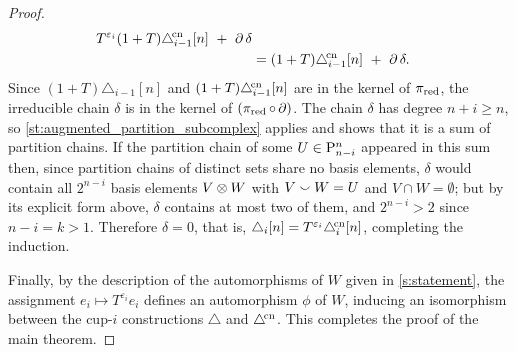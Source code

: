 \begin{proof}
\begin{equation}
\begin{split}
			T^{\varepsilon_i}(1+T)\canonical_{i-1}[n] \ +\ \bd\delta \\ &=
			(1+T)\canonical_{i-1}[n] \ +\ \bd\delta.
		\end{split}
	\end{equation}
	Since $(1+T)\triangle_{i-1}[n]$ and $(1+T)\canonical_{i-1}[n]$ are in the kernel of $\pired$, the irreducible chain $\delta$ is in the kernel of $(\pired \circ \bd)$.
	The chain $\delta$ has degree $n+i\geq n$, so \cref{st:augmented_partition_subcomplex} applies and shows that it is a sum of partition chains.
	If the partition chain of some $U \in \P^n_{n-i}$ appeared in this sum then, since partition chains of distinct sets share no basis elements, $\delta$ would contain all $2^{n-i}$ basis elements $V \ot W$ with $V \union W = U$ and $V \cap W = \emptyset$; but by its explicit form above, $\delta$ contains at most two of them, and $2^{n-i} > 2$ since $n - i = k > 1$.
	Therefore $\delta = 0$, that is, $\triangle_i[n] = T^{\varepsilon_i}\canonical_i[n]$, completing the induction.

	Finally, by the description of the automorphisms of $W$ given in \cref{s:statement}, the assignment $e_i \mapsto T^{\varepsilon_i} e_i$ defines an automorphism $\phi$ of $W$, inducing an isomorphism between the \mbox{cup-$i$} constructions $\triangle$ and $\canonical$.
	This completes the proof of the main theorem.
\end{proof}

